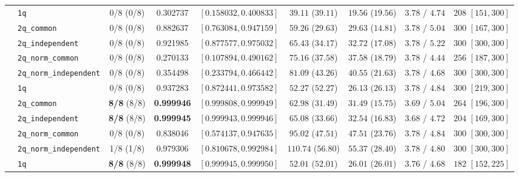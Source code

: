 \documentclass[10pt,a4paper]{article}
\begin{document}
\begin{table}[h!]
{\begin{tabular}{llccccccc}
\midrule
  & \texttt{1q} & 0/8 (0/8) & 0.302737 & $[0.158032, 0.400833]$ & $39.11$ ($39.11$) & $19.56$ ($19.56$) & $3.78$ / $4.74$ & $208$ $[151, 300]$ \\
  & \texttt{2q\_common} & 0/8 (0/8) & 0.882637 & $[0.763084, 0.947159]$ & $59.26$ ($29.63$) & $29.63$ ($14.81$) & $3.78$ / $5.04$ & $300$ $[167, 300]$ \\
  & \texttt{2q\_independent} & 0/8 (0/8) & 0.921985 & $[0.877577, 0.975032]$ & $65.43$ ($34.17$) & $32.72$ ($17.08$) & $3.78$ / $5.22$ & $300$ $[300, 300]$ \\
  & \texttt{2q\_norm\_common} & 0/8 (0/8) & 0.270133 & $[0.107894, 0.490162]$ & $75.16$ ($37.58$) & $37.58$ ($18.79$) & $3.78$ / $4.44$ & $256$ $[187, 300]$ \\
  & \texttt{2q\_norm\_independent} & 0/8 (0/8) & 0.354498 & $[0.233794, 0.466442]$ & $81.09$ ($43.26$) & $40.55$ ($21.63$) & $3.78$ / $4.68$ & $300$ $[300, 300]$ \\
\midrule
  & \texttt{1q} & 0/8 (0/8) & 0.937283 & $[0.872441, 0.973582]$ & $52.27$ ($52.27$) & $26.13$ ($26.13$) & $3.78$ / $4.84$ & $300$ $[219, 300]$ \\
  & \texttt{2q\_common} & \textbf{8/8} (8/8) & \textbf{0.999946} & $[0.999808, 0.999949]$ & $62.98$ ($31.49$) & $31.49$ ($15.75$) & $3.69$ / $5.04$ & $264$ $[196, 300]$ \\
  & \texttt{2q\_independent} & \textbf{8/8} (8/8) & \textbf{0.999945} & $[0.999943, 0.999946]$ & $65.08$ ($33.66$) & $32.54$ ($16.83$) & $3.68$ / $4.72$ & $204$ $[169, 300]$ \\
  & \texttt{2q\_norm\_common} & 0/8 (0/8) & 0.838046 & $[0.574137, 0.947635]$ & $95.02$ ($47.51$) & $47.51$ ($23.76$) & $3.78$ / $4.84$ & $300$ $[300, 300]$ \\
  & \texttt{2q\_norm\_independent} & 1/8 (1/8) & 0.979306 & $[0.810678, 0.992984]$ & $110.74$ ($56.80$) & $55.37$ ($28.40$) & $3.78$ / $4.80$ & $300$ $[300, 300]$ \\
\midrule
  & \texttt{1q} & \textbf{8/8} (8/8) & \textbf{0.999948} & $[0.999945, 0.999950]$ & $52.01$ ($52.01$) & $26.01$ ($26.01$) & $3.76$ / $4.68$ & $182$ $[152, 225]$ \\

\end{tabular}}
\end{table}
\end{document}
